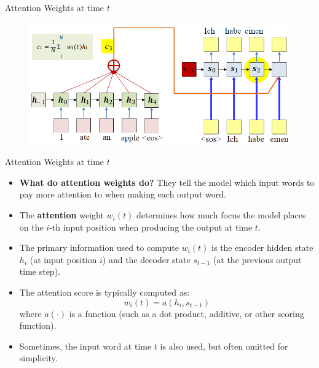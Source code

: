 \begin{frame}{Attention Weights at time $t$}
    \begin{figure}
        \centering
        \includegraphics[width=\linewidth, height=0.9\textheight,keepaspectratio]{images/nlp/attention-weights.png}
    \end{figure}
\end{frame}
\begin{frame}{Attention Weights at time $t$}
    \begin{itemize}
        \setlength{\itemsep}{-0.5em}
        \item \textbf{What do attention weights do?} They tell the model which input words to pay more attention to when making each output word.
        \item<2-> The \textbf{attention} weight $w_i(t)$ determines how much focus the model places on the $i$-th input position when producing the output at time $t$.
        \item<3-> The primary information used to compute $w_i(t)$ is the encoder hidden state $h_i$ (at input position $i$) and the decoder state $s_{t-1}$ (at the previous output time step).
        \item<4-> The attention score is typically computed as:
            \[
            w_i(t) = a(h_i, s_{t-1})
            \]
            where $a(\cdot)$ is a function (such as a dot product, additive, or other scoring function).
        \item<5-> Sometimes, the input word at time $t$ is also used, but often omitted for simplicity.
    \end{itemize}
\end{frame}

